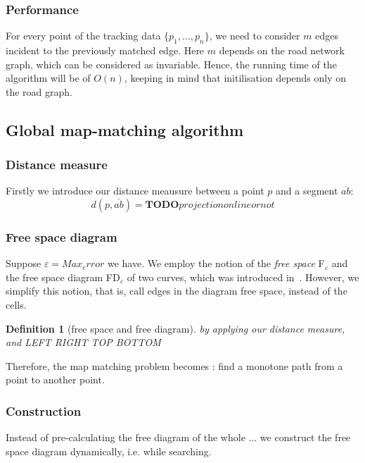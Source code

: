 \documentclass[a4paper,twoside,11pt]{article}
\newcommand{\todo}{\textbf{TODO}}
\theoremstyle{plain}
\newtheorem{definition}{Definition}
\theoremstyle{definition}  %
\begin{document}
\subsubsection*{Performance}
For every point of the tracking data $\{p_1,\ldots,p_n\}$,
we need to consider $m$ edges incident to the previously matched edge.
Here $m$ depends on the road network graph, which can be considered
as invariable. Hence, the running time of the algorithm will be of $O(n)$,
keeping in mind that initilisation depends only on the road graph.


\subsection{Global map-matching algorithm}
\label{sec:algorithms:frechet}

\subsubsection*{Distance measure}
	Firstly we introduce our distance meausure between a point $p$ and a segment $\overline{ab}$:
	\begin{equation}
		d(p, \overline{ab}) = \todo{projection on line or not}
	\end{equation}
	
\subsubsection*{Free space diagram}
	Suppose $\varepsilon = Max_error$ we have.
	We employ the notion of the \emph{free space} F$_\varepsilon$ and the free space diagram FD$_\varepsilon$
	of two curves, which was introduced in~\cite{alt:computing}. However, we simplify this notion, that is,
	call edges in the diagram free space, instead of the cells.
	\begin{definition}[free space and free diagram]
		by applying our distance measure, and LEFT RIGHT TOP BOTTOM
	\end{definition}
	
	\begin{figure}
	\end{figure}

	
	Therefore, the map matching problem becomes : find a monotone path from a point to another point.

\subsubsection*{Construction}
	Instead of pre-calculating the free diagram of the whole ...
	we construct the free space diagram dynamically, i.e. while searching.
	
\end{document}
